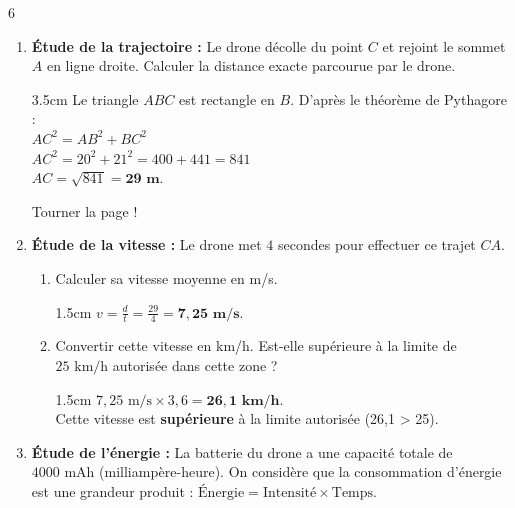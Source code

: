 \documentclass[a4paper]{book}
\begin{document}
{\begin{exerciceNote}{6}
        \begin{enumerate}[leftmargin=*]
            \item \textbf{Étude de la trajectoire :} Le drone décolle du point $C$ et rejoint le sommet $A$ en ligne droite. Calculer la distance exacte parcourue par le drone.

            \begin{ZoneReponse}{3.5cm}                
            Le triangle $ABC$ est rectangle en $B$. D'après le théorème de Pythagore : \\
            $AC^2 = AB^2 + BC^2$ \\
            $AC^2 = 20^2 + 21^2 = 400 + 441 = 841$ \\
            $AC = \sqrt{841} = \mathbf{29 \text{ m}}$.
            \end{ZoneReponse}

\vfill

\hfill Tourner la page !

\newpage
            
            \item \textbf{Étude de la vitesse :} Le drone met $4$ secondes pour effectuer ce trajet $CA$. 
            \begin{enumerate}
                \item Calculer sa vitesse moyenne en m/s.
                \begin{ZoneReponse}{1.5cm}                
                $v = \frac{d}{t} = \frac{29}{4} = \mathbf{7,25 \text{ m/s}}$.
                \end{ZoneReponse}
                
                \item Convertir cette vitesse en km/h. Est-elle supérieure à la limite de $25\text{ km/h}$ autorisée dans cette zone ?
                \begin{ZoneReponse}{1.5cm}                
                $7,25 \text{ m/s} \times 3,6 = \mathbf{26,1 \text{ km/h}}$. \\
                Cette vitesse est \textbf{supérieure} à la limite autorisée (26,1 > 25).
                \end{ZoneReponse}
            \end{enumerate}
        
            \item \textbf{Étude de l'énergie :} 
            La batterie du drone a une capacité totale de $4000\text{ mAh}$ (milliampère-heure). 
            On considère que la consommation d'énergie est une grandeur produit : $\text{Énergie} = \text{Intensité} \times \text{Temps}$.


\end{enumerate}
\end{exerciceNote}}
\end{document}
